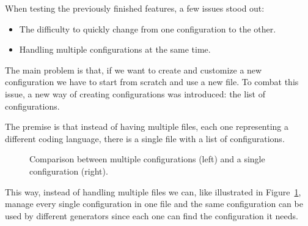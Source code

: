 When testing the previously finished features, a few issues stood out: 

\begin{itemize} 
	\item The difficulty to quickly change from one configuration to the other.
	\item Handling multiple configurations at the same time.
\end{itemize}

The main problem is that, if we want to create and customize a new configuration we have to start from scratch and use a new file. To combat this issue, a new way of creating configurations was introduced: the list of configurations.

The premise is that instead of having multiple files, each one representing a different coding language, there is a single file with a list of configurations.

\begin{figure}[h]
	\centering
{}
\hspace{1cm}
\caption{Comparison between multiple configurations (left) and a single configuration (right).}
\label{fig:tree_config_comparison}
\end{figure}


This way, instead of handling multiple files we can, like illustrated in Figure~\ref{fig:tree_config_comparison}, manage every single configuration in one file and the same configuration can be used by different generators since each one can find the configuration it needs.

